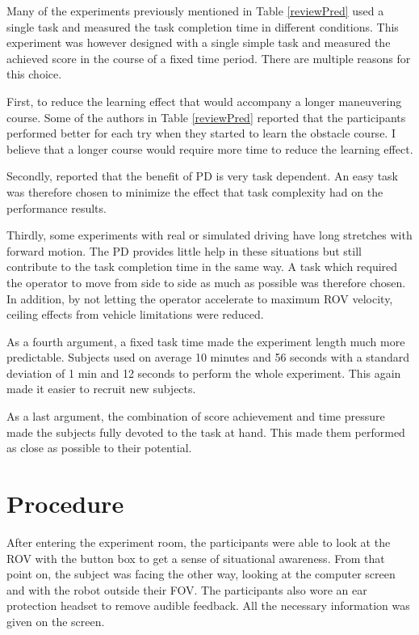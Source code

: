 Many of the experiments previously mentioned in Table \ref{reviewPred} used a single task and measured the task completion time in different conditions. This experiment was however designed with a single simple task and measured the achieved score in the course of a fixed time period. There are multiple reasons for this choice.
\restoregeometry

First, to reduce the learning effect that would accompany a longer maneuvering course. Some of the authors in Table \ref{reviewPred} reported that the participants performed better for each try when they started to learn the obstacle course. I believe that a longer course would require more time to reduce the learning effect.

Secondly, \citet{Chen2007} reported that the benefit of PD is very task dependent. An easy task was therefore chosen to minimize the effect that task complexity had on the performance results. 

Thirdly, some experiments with real or simulated driving have long stretches with forward motion. The PD provides little help in these situations but still contribute to the task completion time in the same way. A task which required the operator to move from side to side as much as possible was therefore chosen. In addition, by not letting the operator accelerate to maximum ROV velocity, ceiling effects from vehicle limitations were reduced. 

As a fourth argument, a fixed task time made the experiment length much more predictable. Subjects used on average 10 minutes and 56 seconds with a standard deviation of 1 min and 12 seconds to perform the whole experiment. This again made it easier to recruit new subjects. 

As a last argument, the combination of score achievement and time pressure made the subjects fully devoted to the task at hand. This made them performed as close as possible to their potential.

\section{Procedure}

After entering the experiment room, the participants were able to look at the ROV with the button box to get a sense of situational awareness. From that point on, the subject was facing the other way, looking at the computer screen and with the robot outside their FOV. The participants also wore an ear protection headset to remove audible feedback. All the necessary information was given on the screen.

